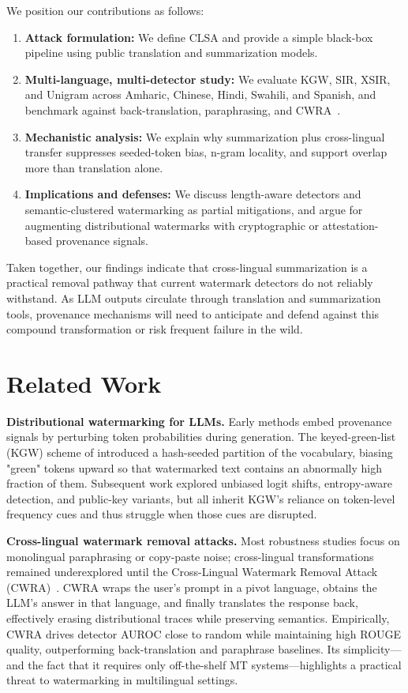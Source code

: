\documentclass{article}
\begin{document}
We position our contributions as follows:
\begin{enumerate}
    \item \textbf{Attack formulation:} We define CLSA and provide a simple black-box pipeline using public translation and summarization models.
    \item \textbf{Multi-language, multi-detector study:} We evaluate KGW, SIR, XSIR, and Unigram across Amharic, Chinese, Hindi, Swahili, and Spanish, and benchmark against back-translation, paraphrasing, and CWRA~\citep{He2024cwra}.
    \item \textbf{Mechanistic analysis:} We explain why summarization plus cross-lingual transfer suppresses seeded-token bias, n-gram locality, and support overlap more than translation alone.
    \item \textbf{Implications and defenses:} We discuss length-aware detectors and semantic-clustered watermarking as partial mitigations, and argue for augmenting distributional watermarks with cryptographic or attestation-based provenance signals.
\end{enumerate}

Taken together, our findings indicate that cross-lingual summarization is a practical removal pathway that current watermark detectors do not reliably withstand. As LLM outputs circulate through translation and summarization tools, provenance mechanisms will need to anticipate and defend against this compound transformation or risk frequent failure in the wild.

\section{Related Work}

\textbf{Distributional watermarking for LLMs.}
Early methods embed provenance signals by perturbing token probabilities during generation.
The keyed-green-list (KGW) scheme of \citet{kirchenbauer2023watermark} introduced a hash-seeded partition of the vocabulary, biasing "green" tokens upward so that watermarked text contains an abnormally high fraction of them.
Subsequent work explored unbiased logit shifts, entropy-aware detection, and public-key variants, but all inherit KGW's reliance on token-level frequency cues and thus struggle when those cues are disrupted.

\textbf{Cross-lingual watermark removal attacks.}
Most robustness studies focus on monolingual paraphrasing or copy-paste noise; cross-lingual transformations remained underexplored until the Cross-Lingual Watermark Removal Attack (CWRA)~\citep{He2024cwra}.
CWRA wraps the user's prompt in a pivot language, obtains the LLM's answer in that language, and finally translates the response back, effectively erasing distributional traces while preserving semantics.
Empirically, CWRA drives detector AUROC close to random while maintaining high ROUGE quality, outperforming back-translation and paraphrase baselines.
Its simplicity—and the fact that it requires only off-the-shelf MT systems—highlights a practical threat to watermarking in multilingual settings.
\end{document}
